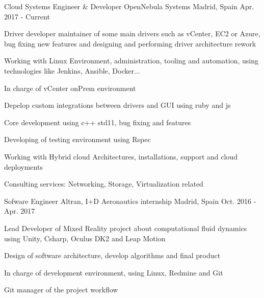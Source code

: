 

\begin{cventries}

  \cventry
    {Cloud Systems Engineer \& Developer} %
    {OpenNebula Systems} %
    {Madrid, Spain} %
    {Apr. 2017 - Current} %
    {
      \begin{cvitems} %
        \item {Driver developer maintainer of some main drivers such as vCenter, EC2 or Azure, bug fixing new features and designing and performing driver architecture rework}
        \item {Working with Linux Environment, administration, tooling and automation, using technologies like Jenkins, Ansible, Docker...}
        \item {In charge of vCenter onPrem environment}
        \item {Depelop custom integrations between drivers and GUI using ruby and js}
        \item {Core development using c++ std11, bug fixing and features}
        \item {Developing of testing environment using Rspec}
        \item {Working with Hybrid cloud Architectures, installations, support and cloud deployments}
        \item {Consulting services: Networking, Storage, Virtualization related}
      \end{cvitems}
    }

  \cventry
    {Sofware Engineer} %
    {Altran, I+D Aeronautics internship} %
    {Madrid, Spain} %
    {Oct. 2016 - Apr. 2017} %
    {
      \begin{cvitems} %
        \item {Lead Developer of Mixed Reality project about computational fluid dynamics using Unity, Csharp, Oculus DK2 and Leap Motion}
        \item {Design of software architecture, develop algorithms and final product}
        \item {In charge of development environment, using Linux, Redmine and Git}
        \item {Git manager of the project workflow}
      \end{cvitems}
    }


\end{cventries}
